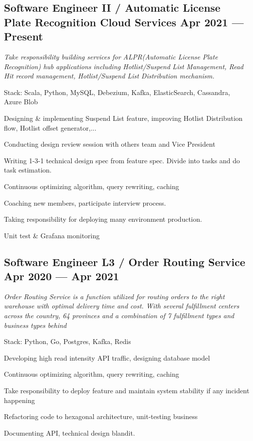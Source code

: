 \documentclass[letter,10pt]{article}
\begin{document}
\subsection{{Software Engineer II / Automatic License Plate Recognition Cloud Services \hfill Apr 2021 --- Present}} 
\hfill \break
\textit{Take responsibility building services for ALPR(Automatic License Plate Recognition) hub applications including Hotlist/Suspend List Management, Read Hit record management, Hotlist/Suspend List Distribution mechanism.}
\begin{zitemize}
\item Stack: Scala, Python, MySQL, Debezium, Kafka, ElasticSearch, Cassandra, Azure Blob
\item Designing & implementing Suspend List feature, improving Hotlist Distribution flow, Hotlist offset generator,...
\item Conducting design review session with others team and Vice President
\item Writing 1-3-1 technical design spec from feature spec. Divide into tasks and do task estimation.
\item Continuous optimizing algorithm, query rewriting, caching
\item Coaching new members, participate interview process.
\item Taking responsibility for deploying many environment production.
\item Unit test & Grafana monitoring
\end{zitemize}

\subsection{{Software Engineer L3 / Order Routing Service \hfill Apr 2020 --- Apr 2021}}
\hfill \break
\textit{Order Routing Service is a function utilized for routing orders to the right warehouse with optimal delivery time and cost. With several fulfillment centers across the country, 64 provinces and a combination of 7 fulfillment types and business types behind}
\begin{zitemize}
\item Stack: Python, Go, Postgres, Kafka, Redis
\item Developing high read intensity API traffic, designing database model
\item Continuous optimizing algorithm, query rewriting, caching 
\item Take responsibility to deploy feature and maintain system stability if any incident happening
\item Refactoring code to hexagonal architecture, unit-testing business
\item Documenting API, technical design blandit.
\end{zitemize}
\end{document}
